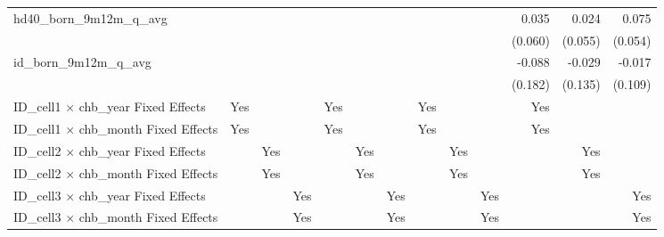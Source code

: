 \begin{tabular}{lrrrrrrrrrrrr}
hd40\_born\_9m12m\_q\_avg                   &              &              &              &              &              &              &              &              &              &        0.035 &        0.024 &        0.075 \\ 
                                            &              &              &              &              &              &              &              &              &              &      (0.060) &      (0.055) &      (0.054) \\ 
id\_born\_9m12m\_q\_avg                     &              &              &              &              &              &              &              &              &              &       -0.088 &       -0.029 &       -0.017 \\ 
                                            &              &              &              &              &              &              &              &              &              &      (0.182) &      (0.135) &      (0.109) \\ 
\midrule
ID\_cell1 $\times$ chb\_year Fixed Effects  &          Yes &              &              &          Yes &              &              &          Yes &              &              &          Yes &              &              \\ 
ID\_cell1 $\times$ chb\_month Fixed Effects &          Yes &              &              &          Yes &              &              &          Yes &              &              &          Yes &              &              \\ 
ID\_cell2 $\times$ chb\_year Fixed Effects  &              &          Yes &              &              &          Yes &              &              &          Yes &              &              &          Yes &              \\ 
ID\_cell2 $\times$ chb\_month Fixed Effects &              &          Yes &              &              &          Yes &              &              &          Yes &              &              &          Yes &              \\ 
ID\_cell3 $\times$ chb\_year Fixed Effects  &              &              &          Yes &              &              &          Yes &              &              &          Yes &              &              &          Yes \\ 
ID\_cell3 $\times$ chb\_month Fixed Effects &              &              &          Yes &              &              &          Yes &              &              &          Yes &              &              &          Yes \\ 

\end{tabular}
